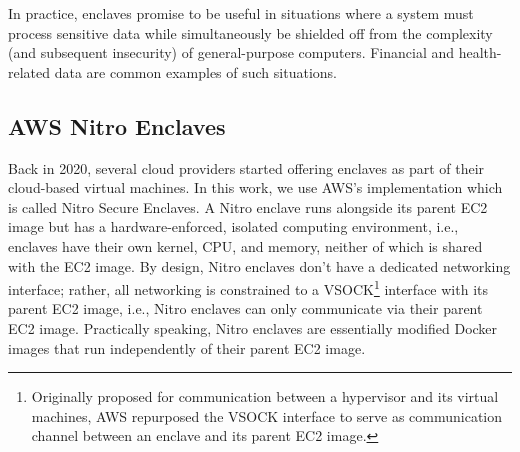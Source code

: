 In practice, enclaves promise to be useful in situations where a system must process sensitive data while simultaneously be shielded off from the complexity (and subsequent insecurity) of general-purpose computers. Financial and health-related data are common examples of such situations.

\subsection{AWS Nitro Enclaves}
\label{sec:nitro}

Back in 2020, several cloud providers started offering enclaves as part of their cloud-based virtual machines.  In this work, we use AWS's implementation which is called Nitro Secure Enclaves.  A Nitro enclave runs alongside its parent EC2 image but has a hardware-enforced, isolated computing environment, i.e., enclaves have their own kernel, CPU, and memory, neither of which is shared with the EC2 image.  By design, Nitro enclaves don't have a dedicated networking interface; rather, all networking is constrained to a VSOCK\footnote{Originally proposed for communication between a hypervisor and its virtual machines, AWS repurposed the VSOCK interface to serve as communication channel between an enclave and its parent EC2 image.} interface with its parent EC2 image, i.e., Nitro enclaves can only communicate via their parent EC2 image. Practically speaking, Nitro enclaves are essentially modified Docker images that run independently of their parent EC2 image.